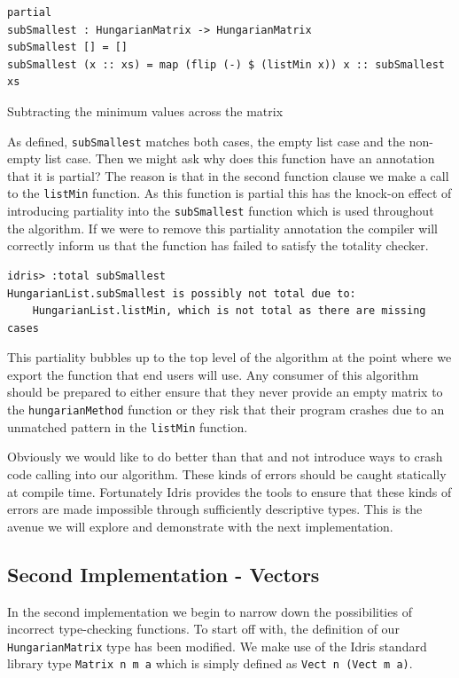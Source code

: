 \documentclass[a4paper, notitlepage]{report}
\begin{document}
\begin{listing}[H]
\begin{verbatim}
partial
subSmallest : HungarianMatrix -> HungarianMatrix
subSmallest [] = []
subSmallest (x :: xs) = map (flip (-) $ (listMin x)) x :: subSmallest xs
\end{verbatim}
\caption{Subtracting the minimum values across the matrix}
\end{listing}

As defined, \texttt{subSmallest} matches both cases, the empty list case and the
non-empty list case. Then we might ask why does this function have an annotation
that it is partial? The reason is that in the second function clause we make a
call to the \texttt{listMin} function. As this function is partial this has the knock-on
effect of introducing partiality into the \texttt{subSmallest} function which is used
throughout the algorithm. If we were to remove this partiality annotation the
compiler will correctly inform us that the function has failed to satisfy the
totality checker.

\begin{verbatim}
idris> :total subSmallest
HungarianList.subSmallest is possibly not total due to:
    HungarianList.listMin, which is not total as there are missing cases
\end{verbatim}

This partiality bubbles up to the top level of the algorithm at the point where
we export the function that end users will use. Any consumer of this algorithm
should be prepared to either ensure that they never provide an empty matrix to
the \texttt{hungarianMethod} function or they risk that their program crashes due to an
unmatched pattern in the \texttt{listMin} function.

Obviously we would like to do better than that and not introduce ways to crash
code calling into our algorithm. These kinds of errors should be caught
statically at compile time. Fortunately Idris provides the tools to ensure that
these kinds of errors are made impossible through sufficiently descriptive
types. This is the avenue we will explore and demonstrate with the next
implementation.

\subsection{Second Implementation - Vectors}
\label{sec:org5aa863d}
In the second implementation we begin to narrow down the possibilities of
incorrect type-checking functions. To start off with, the definition of our
\texttt{HungarianMatrix} type has been modified. We make use of the Idris standard
library type \texttt{Matrix n m a} which is simply defined as \texttt{Vect n (Vect m a)}.
\end{document}
